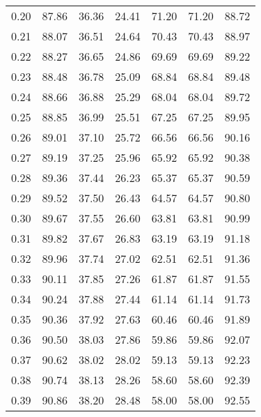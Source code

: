 \begin{tabular}{|c|c|c|c|c|c|c|}
      0.20 &     87.86 &     36.36 &      24.41 &   71.20 &      71.20 &         88.72 \\
      0.21 &     88.07 &     36.51 &      24.64 &   70.43 &      70.43 &         88.97 \\
      0.22 &     88.27 &     36.65 &      24.86 &   69.69 &      69.69 &         89.22 \\
      0.23 &     88.48 &     36.78 &      25.09 &   68.84 &      68.84 &         89.48 \\
      0.24 &     88.66 &     36.88 &      25.29 &   68.04 &      68.04 &         89.72 \\
      0.25 &     88.85 &     36.99 &      25.51 &   67.25 &      67.25 &         89.95 \\
      0.26 &     89.01 &     37.10 &      25.72 &   66.56 &      66.56 &         90.16 \\
      0.27 &     89.19 &     37.25 &      25.96 &   65.92 &      65.92 &         90.38 \\
      0.28 &     89.36 &     37.44 &      26.23 &   65.37 &      65.37 &         90.59 \\
      0.29 &     89.52 &     37.50 &      26.43 &   64.57 &      64.57 &         90.80 \\
      0.30 &     89.67 &     37.55 &      26.60 &   63.81 &      63.81 &         90.99 \\
      0.31 &     89.82 &     37.67 &      26.83 &   63.19 &      63.19 &         91.18 \\
      0.32 &     89.96 &     37.74 &      27.02 &   62.51 &      62.51 &         91.36 \\
      0.33 &     90.11 &     37.85 &      27.26 &   61.87 &      61.87 &         91.55 \\
      0.34 &     90.24 &     37.88 &      27.44 &   61.14 &      61.14 &         91.73 \\
      0.35 &     90.36 &     37.92 &      27.63 &   60.46 &      60.46 &         91.89 \\
      0.36 &     90.50 &     38.03 &      27.86 &   59.86 &      59.86 &         92.07 \\
      0.37 &     90.62 &     38.02 &      28.02 &   59.13 &      59.13 &         92.23 \\
      0.38 &     90.74 &     38.13 &      28.26 &   58.60 &      58.60 &         92.39 \\
      0.39 &     90.86 &     38.20 &      28.48 &   58.00 &      58.00 &         92.55 \\

\end{tabular}
